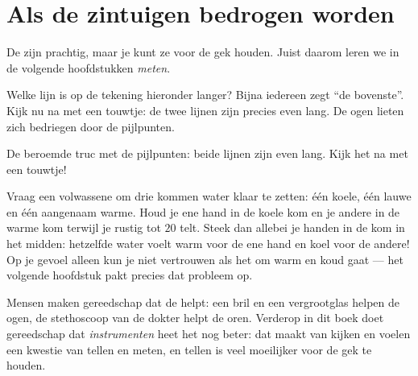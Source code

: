 \section{Als de zintuigen bedrogen worden}

De  zijn prachtig, maar je kunt ze voor de gek houden. Juist
daarom leren we in de volgende hoofdstukken \emph{meten}.

\begin{example}\label{ex:g1:five-senses:lines}
Welke lijn is op de tekening hieronder langer? Bijna iedereen zegt
``de bovenste''. Kijk nu na met een touwtje: de twee lijnen zijn
precies even lang. De ogen lieten zich bedriegen door de pijlpunten.
\end{example}

\begin{omfigure}

{\small De beroemde truc met de pijlpunten: beide lijnen zijn even
lang. Kijk het na met een touwtje!}
\end{omfigure}

\begin{example}\label{ex:g1:five-senses:bowls}
Vraag een volwassene om drie kommen water klaar te zetten: één koele,
één lauwe en één aangenaam warme. Houd je ene hand in de koele kom en
je andere in de warme kom terwijl je rustig tot $20$ telt. Steek dan
allebei je handen in de kom in het midden: hetzelfde water voelt warm
voor de ene hand en koel voor de andere! Op je gevoel alleen kun je
niet vertrouwen als het om warm en koud gaat --- het volgende
hoofdstuk pakt precies dat probleem op.
\end{example}

\begin{remark}\label{rem:g1:five-senses:tools}
Mensen maken gereedschap dat de  helpt: een bril en een
vergrootglas helpen de ogen, de stethoscoop van de dokter helpt de
oren. Verderop in dit boek doet gereedschap dat \emph{instrumenten}
heet het nog beter: dat maakt van kijken en voelen een kwestie van
tellen en meten, en tellen is veel moeilijker voor de gek te houden.
\end{remark}

